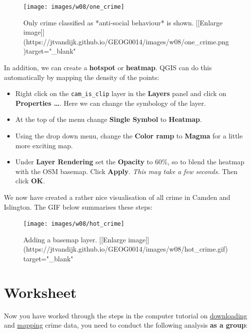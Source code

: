 \documentclass[
]{book}
\providecommand{\tightlist}{%
  \setlength{\itemsep}{0pt}\setlength{\parskip}{0pt}}
\begin{document}
\begin{figure}

{\centering \texttt{[image: images/w08/one\_crime]} 

}

\caption{Only crime classified as *anti-social behaviour* is shown. [[Enlarge image]](https://jtvandijk.github.io/GEOG0014/images/w08/one_crime.png){target="_blank"}}\label{fig:one-crime}
\end{figure}

In addition, we can create a \textbf{hotspot} or \textbf{heatmap}. QGIS can do this automatically by mapping the density of the points:

\begin{itemize}
\tightlist
\item
  Right click on the \texttt{cam\_is\_clip} layer in the \textbf{Layers} panel and click on \textbf{Properties \ldots{}}. Here we can change the symbology of the layer.
\item
  At the top of the menu change \textbf{Single Symbol} to \textbf{Heatmap}.
\item
  Using the drop down menu, change the \textbf{Color ramp} to \textbf{Magma} for a little more exciting map.
\item
  Under \textbf{Layer Rendering} set the \textbf{Opacity} to 60\%, so to blend the heatmap with the OSM basemap. Click \textbf{Apply}. \emph{This may take a few seconds.} Then click \textbf{OK}.
\end{itemize}

We now have created a rather nice visualisation of all crime in Camden and Islington. The GIF below summarises these steps:

\begin{figure}

{\centering \texttt{[image: images/w08/hot\_crime]} 

}

\caption{Adding a basemap layer. [[Enlarge image]](https://jtvandijk.github.io/GEOG0014/images/w08/hot_crime.gif){target="_blank"}}\label{fig:hot-crime}
\end{figure}

\hypertarget{worksheet}{%
\section*{Worksheet}\label{worksheet}}

Now you have worked through the steps in the computer tutorial on \protect\hyperlink{downloading-crime-data}{downloading} and \protect\hyperlink{mapping-crime-data}{mapping} crime data, you need to conduct the following analysis \textbf{as a group}:
\end{document}
